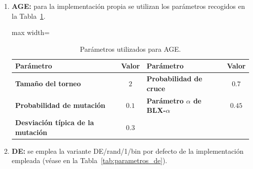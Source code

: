 \begin{enumerate}
    \item \textbf{AGE:} para la implementación propia se utilizan los parámetros recogidos en la Tabla~\ref{tab:parametros_age}.

          \begin{table}[htbp]
              \centering
              \begin{adjustbox}{max width=\textwidth}
                  \begin{tabular}{lc|lc}
                      \toprule
                      \textbf{Parámetro}                              & \textbf{Valor} &
                      \textbf{Parámetro}                              & \textbf{Valor}   \\
                      \midrule
                      \textbf{Tamaño del torneo}                      & \(2\)          &
                      \textbf{Probabilidad de cruce}                  & \(0.7\)          \\
                      \textbf{Probabilidad de mutación}               & \(0.1\)        &
                      \textbf{Parámetro \(\alpha\) de BLX-\(\alpha\)} & \(0.45\)         \\
                      \textbf{Desviación típica de la mutación}       & \(0.3\)        &
                                                                      &                  \\
                      \bottomrule
                  \end{tabular}
              \end{adjustbox}
              \caption{Parámetros utilizados para AGE.}
              \label{tab:parametros_age}
          \end{table}

    \item \textbf{DE:} se emplea la variante DE/rand/1/bin por defecto de la implementación empleada (véase en la
          Tabla~\ref{tab:parametros_de}).


\end{enumerate}
